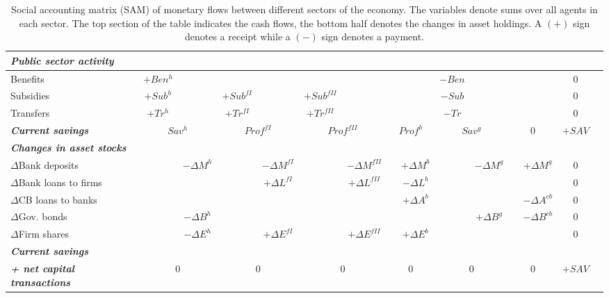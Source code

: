 \begin{landscape}
\begin{table}
\begin{tabular}{|l|c|c|c|c|c|c|c|c|c|c|c|c|c|c|}
\hline
\textbf{\emph{Public sector activity}}  &&&&&&&&&&&&&\\
\hline
    Benefits    & $+Ben^{h}$ & &  &             &  &               &  &   & $-Ben$  &  &  &  & 0\\\hline    
    Subsidies   & $+Sub^{h}$ & & $+Sub^{fI}$ &  & $+Sub^{fII}$  &  &  &   & $-Sub$  &  &  &  & 0\\\hline    
    Transfers   & $+Tr^{h}$  & & $+Tr^{fI}$  &  & $+Tr^{fII}$   &  &  &   & $-Tr$   &  &  &  & 0\\
    \hline
\textbf{\emph{Current savings}} &  \multicolumn{2}{c|}{$Sav^{h}$} &  \multicolumn{2}{c|}{$Prof^{fI}$} &  \multicolumn{2}{c|}{$Prof^{fII}$} &  \multicolumn{2}{c|}{$Prof^{b}$}  &  \multicolumn{2}{c|}{$Sav^{g}$} &  \multicolumn{2}{c|}{$0$} & $+SAV$\\
    \hline\hline
\textbf{\emph{Changes in asset stocks}}  &&&&&&&&&&&&&\\
    \hline
$\Delta$Bank deposits   & & $-\Delta M^h$ &  & $-\Delta M^{fI}$ & & $-\Delta M^{fII}$ & & $+\Delta M^b$ &  &  $-\Delta M^g$ & & $+\Delta M^g$ & 0\\\hline
$\Delta$Bank loans to firms  & & & & $+\Delta L^{fI}$ & & $+\Delta L^{fII}$  &  & $-\Delta L^b$ &  & & & & 0\\\hline
$\Delta$CB loans to banks  &               & &  & & &  & & $+\Delta A^b$   & & & & $-\Delta A^{cb}$ & 0\\\hline
$\Delta$Gov. bonds      & & $-\Delta B^{h}$  &  &  &   &   & &  & & $+\Delta B^g$  & & $-\Delta B^{cb}$ & 0\\\hline
$\Delta$Firm shares   & & $-\Delta E^{h}$   & & $+\Delta E^{fI}$ & & $+\Delta E^{fII}$ & & $+\Delta E^b$ & & & & & 0\\
    \hline
\textbf{\emph{Current savings}}  &&&&&&&&&&&&&\\
    \hline
\textbf{\emph{+ net capital transactions}}&  \multicolumn{2}{c|}{$0$} &  \multicolumn{2}{c|}{$0$} &  \multicolumn{2}{c|}{$0$} &  \multicolumn{2}{c|}{$0$}  &  \multicolumn{2}{c|}{$0$} &  \multicolumn{2}{c|}{$0$} & $+SAV$\\
    \hline\hline
  \end{tabular}
  \caption{Social accounting matrix (SAM) of monetary flows between different sectors of the economy. The variables denote sums over all agents in each sector. The top section of the table indicates the cash flows, the bottom half denotes the changes in asset holdings. A $(+)$ sign denotes a receipt while a $(-)$ sign denotes a payment.}
  \label{Accounting matrix: flows}
\end{table}
\end{landscape}


